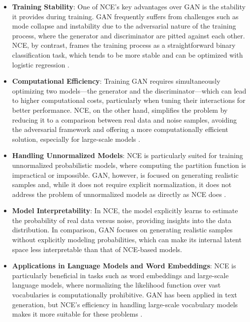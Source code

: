 \begin{itemize}
    \item \textbf{Training Stability}: One of NCE’s key advantages over GAN is the stability it provides during training. GAN frequently suffers from challenges such as mode collapse and instability due to the adversarial nature of the training process, where the generator and discriminator are pitted against each other. NCE, by contrast, frames the training process as a straightforward binary classification task, which tends to be more stable and can be optimized with logistic regression \citep{10.18653/v1/e17-2003}.
    
    \item \textbf{Computational Efficiency}: Training GAN requires simultaneously optimizing two models—the generator and the discriminator—which can lead to higher computational costs, particularly when tuning their interactions for better performance. NCE, on the other hand, simplifies the problem by reducing it to a comparison between real data and noise samples, avoiding the adversarial framework and offering a more computationally efficient solution, especially for large-scale models \citep{10.21437/interspeech.2016-1295}.
    
    \item \textbf{Handling Unnormalized Models}: NCE is particularly suited for training unnormalized probabilistic models, where computing the partition function is impractical or impossible. GAN, however, is focused on generating realistic samples and, while it does not require explicit normalization, it does not address the problem of unnormalized models as directly as NCE does \citep{10.48550/arxiv.2101.03288}.
    
    \item \textbf{Model Interpretability}: In NCE, the model explicitly learns to estimate the probability of real data versus noise, providing insights into the data distribution. In comparison, GAN focuses on generating realistic samples without explicitly modeling probabilities, which can make its internal latent space less interpretable than that of NCE-based models.
    
    \item \textbf{Applications in Language Models and Word Embeddings}: NCE is particularly beneficial in tasks such as word embeddings and large-scale language models, where normalizing the likelihood function over vast vocabularies is computationally prohibitive. GAN has been applied in text generation, but NCE’s efficiency in handling large-scale vocabulary models makes it more suitable for these problems \citep{10.48550/arxiv.2101.03288}.
\end{itemize}

